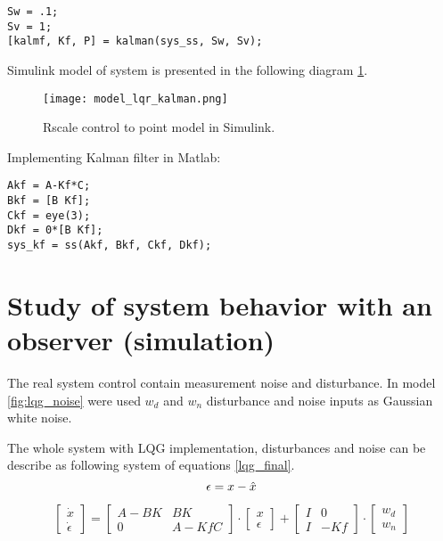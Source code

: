 \begin{lstlisting}[frame=single]
Sw = .1;
Sv = 1;
[kalmf, Kf, P] = kalman(sys_ss, Sw, Sv); 
\end{lstlisting}

Simulink model of system is presented in the following diagram
\ref{fig:lqg}.

\begin{figure}[hbt!]
    \centering
    \texttt{[image: model\_lqr\_kalman.png]}
    \caption{Rscale control to point model in Simulink.}
    \label{fig:lqg}
\end{figure}

Implementing Kalman filter in Matlab:
\begin{lstlisting}[frame=single]
Akf = A-Kf*C;
Bkf = [B Kf];
Ckf = eye(3);
Dkf = 0*[B Kf];
sys_kf = ss(Akf, Bkf, Ckf, Dkf);
\end{lstlisting}

\section{Study of system behavior with an observer (simulation)}
The real system control contain measurement noise and disturbance. In model
\ref{fig:lqg_noise} were used $w_d$ and $w_n$ disturbance and noise inputs
as Gaussian white noise.


The whole system with LQG implementation, disturbances and noise can be
describe as following system of equations \ref{lqg_final}.
\begin{equation}
        \epsilon = x - \hat{x} \\
\end{equation}


\begin{equation}\label{lqg_final}
\begin{bmatrix} \dot{x} \\ \dot{\epsilon} \end{bmatrix}  = 
\begin{bmatrix} A-BK & BK \\ 0 & A-KfC \end{bmatrix} \cdot 
\begin{bmatrix} x \\ \epsilon \end{bmatrix} +
\begin{bmatrix} I & 0 \\
                I & -Kf
\end{bmatrix} \cdot
\begin{bmatrix} w_d \\ w_n \end{bmatrix}
\end{equation}

